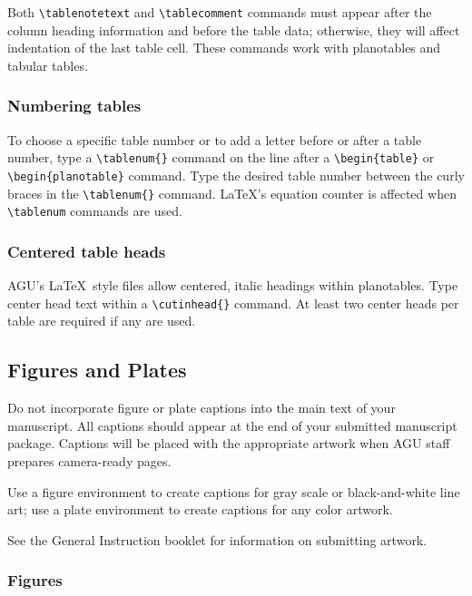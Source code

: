 \begin{article}
Both \verb"\tablenotetext" and \verb"\tablecomment" 
commands must appear after the column heading information
and before the table data; otherwise, they will affect
indentation of the last table cell.  These commands 
work with planotables and tabular tables.

\subsubsection{Numbering tables}\label{numtabl}

To choose a specific table number or to add a
letter before or after a table number, type a 
\verb"\tablenum{}" command on the line after a 
\verb"\begin{table}" or \verb"\begin{planotable}" 
command.  Type the desired table number between 
the curly braces in the \verb"\tablenum{}" command.
\linebreak \LaTeX's equation counter is affected 
when \verb"\tablenum" commands are used.

\subsubsection{Centered table heads}
AGU's \LaTeX\ style files allow centered, italic 
headings within planotables.  Type center head 
text within a \verb"\cutinhead{}" command.  At 
least two center heads per table are required 
if any are used.


\subsection{Figures and Plates}

Do not incorporate figure or plate captions
into the main text of your manuscript.  All captions 
should appear at the end of your submitted manuscript 
package.  Captions will be placed with the appropriate 
artwork when AGU staff prepares camera-ready pages.

Use a figure environment to create captions for 
gray scale or black-and-white line art; use a plate 
environment to create captions for any color artwork.

See the General Instruction booklet for information on
submitting artwork.


\subsubsection{Figures}


\end{article}
